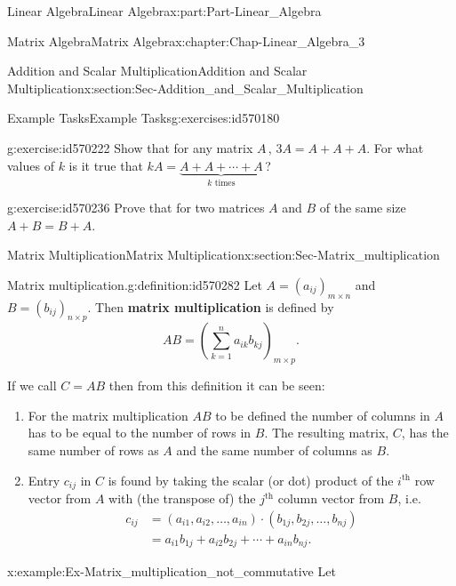 \documentclass[oneside,10pt,]{book}
\newcommand{\terminology}[1]{\textbf{#1}}
\numberwithin{equation}{section}
\newcommand{\amp}{&}
\begin{document}
\begin{partptx}{Linear Algebra}{}{Linear Algebra}{}{}{x:part:Part-Linear_Algebra}
\begin{chapterptx}{Matrix Algebra}{}{Matrix Algebra}{}{}{x:chapter:Chap-Linear_Algebra_3}
\begin{sectionptx}{Addition and Scalar Multiplication}{}{Addition and Scalar Multiplication}{}{}{x:section:Sec-Addition_and_Scalar_Multiplication}
\begin{exercises-subsection-numberless}{Example Tasks}{}{Example Tasks}{}{}{g:exercises:id570180}
\begin{divisionexercise}{2}{}{}{g:exercise:id570222}
Show that for any matrix \(A\,\), \(3A = A + A + A\). For what values of \(k\) is it true that \(kA = \underbrace{A + A + \cdots + A}_{k \mbox{ times}}\,\)?%
\end{divisionexercise}%
\begin{divisionexercise}{3}{}{}{g:exercise:id570236}%
Prove that for two matrices \(A\) and \(B\) of the same size \(A+B = B+A\).%
\end{divisionexercise}%
\end{exercises-subsection-numberless}
\end{sectionptx}
%
%
\typeout{************************************************}
\typeout{************************************************}
%
\begin{sectionptx}{Matrix Multiplication}{}{Matrix Multiplication}{}{}{x:section:Sec-Matrix_multiplication}
\begin{definition}{Matrix multiplication.}{g:definition:id570282}%
Let \(A=\left(a_{ij}\right)_{m \times n}\) and \(B = \left(b_{ij}\right)_{n \times p}\). Then \terminology{matrix multiplication} is defined by%
\begin{equation*}
AB = \left(\sum_{k=1}^n a_{ik}b_{kj}\right)_{m \times p}.
\end{equation*}
\end{definition}
If we call \(C=AB\)  then from this definition it can be seen:%
\begin{enumerate}[label=\arabic*]
\item{}For the matrix multiplication \(AB\) to be defined the number of columns in \(A\) has to be equal to the number of rows in \(B\). The resulting matrix, \(C\), has the same number of rows as \(A\) and the same number of columns as \(B\).%
\item{}Entry \(c_{ij}\) in \(C\) is found by taking the scalar (or dot) product of the \(i^{\mbox{th}}\) row vector from \(A\) with (the transpose of) the \(j^{\mbox{th}}\) column vector from \(B\), i.e.%
\begin{align*}
c_{ij} \amp = (a_{i1},a_{i2}, \ldots, a_{in})\cdot (b_{1j},b_{2j}, \ldots, b_{nj}) \\
\amp = a_{i1}b_{1j} + a_{i2}b_{2j} + \cdots + a_{in}b_{nj}.
\end{align*}
%
\end{enumerate}
%
\begin{example}{}{x:example:Ex-Matrix_multiplication_not_commutative}%
Let%
\begin{equation*}

\end{equation*}
\end{example}
\end{sectionptx}
\end{chapterptx}
\end{partptx}
\end{document}
